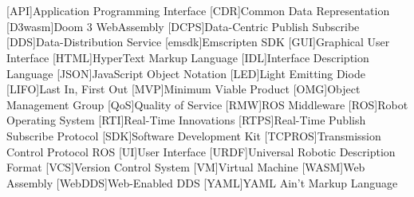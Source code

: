 \chapter*{}



\section*{}
\begin{acronym}[LONGEST]

    [API]{Application Programming Interface}
    [CDR]{Common Data Representation}
    [D3wasm]{Doom 3 WebAssembly}
    [DCPS]{Data-Centric Publish Subscribe}
    [DDS]{Data-Distribution Service}
    [emsdk]{Emscripten SDK}
    [GUI]{Graphical User Interface}
    [HTML]{HyperText Markup Language}
    [IDL]{Interface Description Language}
    [JSON]{JavaScript Object Notation}
    [LED]{Light Emitting Diode}
    [LIFO]{Last In, First Out}
    [MVP]{Minimum Viable Product}
    [OMG]{Object Management Group}
    [QoS]{Quality of Service}
    [RMW]{ROS Middleware}
    [ROS]{Robot Operating System}
    [RTI]{Real-Time Innovations}
    [RTPS]{Real-Time Publish Subscribe Protocol}
    [SDK]{Software Development Kit}
    [TCPROS]{Transmission Control Protocol ROS}
    [UI]{User Interface}
    [URDF]{Universal Robotic Description Format}
    [VCS]{Version Control System}
    [VM]{Virtual Machine}
    [WASM]{Web Assembly}
    [WebDDS]{Web-Enabled DDS}
    [YAML]{YAML Ain't Markup Language}

\end{acronym}

